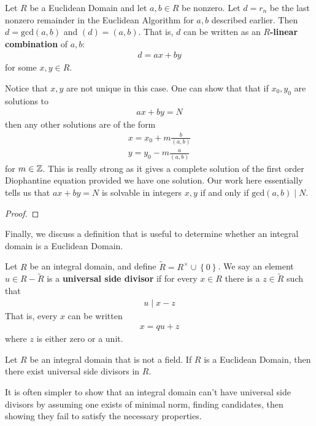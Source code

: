 \documentclass{memoir}
\begin{document}
\begin{thm}
	Let \(R\) be a Euclidean Domain and let \(a,b \in R\) be nonzero. Let \(d = r_n\) be the last nonzero remainder in the Euclidean Algorithm for \(a,b\) described earlier. Then \(d = \textrm{gcd}(a,b)\) and \((d) = (a,b)\). That is, \(d\) can be written as an \textbf{\(R\)-linear combination} of \(a,b\):
	\begin{align*}
		d = ax+by
	\end{align*}
	for some \(x,y \in R\).
\end{thm}
Notice that \(x,y\) are not unique in this case. One can show that that if \(x_0,y_0\) are solutions to
\begin{align*}
	ax+by=N
\end{align*}
then any other solutions are of the form
\begin{align*}
	x = x_0 + m \frac{b}{(a,b)}\\
	y = y_0 - m \frac{a}{(a,b)}
\end{align*}
for \(m \in \mathbb{Z}\). This is really strong as it gives a complete solution of the first order Diophantine equation provided we have one solution. Our work here essentially tells us that \(ax+by = N\) is solvable in integers \(x,y\) if and only if \(\textrm{gcd}(a,b)\mid N\).

\begin{proof}
	
\end{proof}

Finally, we discuss a definition that is useful to determine whether an integral domain is a Euclidean Domain.
\begin{defn}
	Let \(R\) be an integral domain, and define \(\tilde{R}= R^{\times }\cup \left\{ 0 \right\} \). We say an element \(u \in R-\tilde{R}\) is a \textbf{universal side divisor} if for every \(x \in R\) there is a \(z \in \tilde{R}\) such that
	\begin{align*}
		u\mid x-z
	\end{align*}
	That is, every \(x\) can be written
	\begin{align*}
		x = qu + z
	\end{align*}
	where \(z\) is either zero or a unit.
\end{defn}

\begin{prop}
	Let \(R\) be an integral domain that is not a field. If \(R\) is a Euclidean Domain, then there exist universal side divisors in \(R\).
\end{prop}
It is often simpler to show that an integral domain can't have universal side divisors by assuming one exists of minimal norm, finding candidates, then showing they fail to satisfy the necessary properties.
\end{document}
